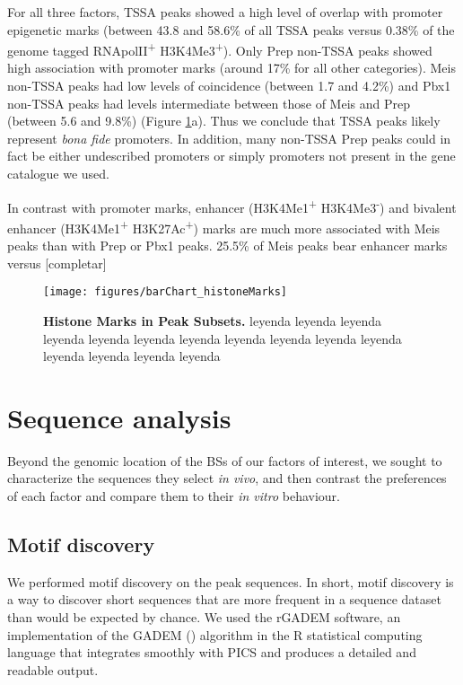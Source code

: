 For all three factors, \ac{TSSA} peaks showed a high level of overlap with promoter epigenetic marks (between 43.8 and 58.6\% of all \ac{TSSA} peaks versus 0.38\% of the genome tagged RNApolII\textsuperscript{+} H3K4Me3\textsuperscript{+}). Only Prep non-\ac{TSSA} peaks showed high association with promoter marks (around 17\% for all other categories). Meis non-\ac{TSSA} peaks had low levels of coincidence (between 1.7 and 4.2\%) and Pbx1 non-\ac{TSSA} peaks had levels intermediate between those of Meis and Prep (between 5.6 and 9.8\%) (Figure \ref{fig:histoneMarks}a). Thus we conclude that \ac{TSSA} peaks likely represent \textit{bona fide} promoters. In addition, many non-\ac{TSSA} Prep peaks could in fact be either undescribed promoters or simply promoters not present in the gene catalogue we used.

In contrast with promoter marks, enhancer (H3K4Me1\textsuperscript{+} H3K4Me3\textsuperscript{-}) and bivalent enhancer (H3K4Me1\textsuperscript{+} H3K27Ac\textsuperscript{+}) marks are much more associated with Meis peaks than with Prep or Pbx1 peaks. 25.5\% of Meis peaks bear enhancer marks versus [completar]





\begin{figure}[]
  
  \centering
  \label{fig:histoneMarks}
  \texttt{[image: figures/barChart\_histoneMarks]}
  \caption[Histone Marks in Peak Subsets]{\textbf{Histone Marks in Peak Subsets.} leyenda leyenda leyenda leyenda leyenda leyenda leyenda leyenda leyenda leyenda leyenda leyenda leyenda leyenda leyenda}
\end{figure}


 
 
\section{Sequence analysis}

Beyond the genomic location of the \acp{BS} of our factors of interest, we sought to characterize the sequences they select \textit{in vivo}, and then contrast the preferences of each factor and compare them to their \textit{in vitro} behaviour. 

\subsection{Motif discovery}

We performed motif discovery on the peak sequences. In short, motif discovery is a way to discover short sequences that are more frequent in a sequence dataset than would be expected by chance. We used the rGADEM software, an implementation of the GADEM (\cite{Li2009a}) algorithm in the R statistical computing language that integrates smoothly with \ac{PICS} and produces a detailed and readable output.

